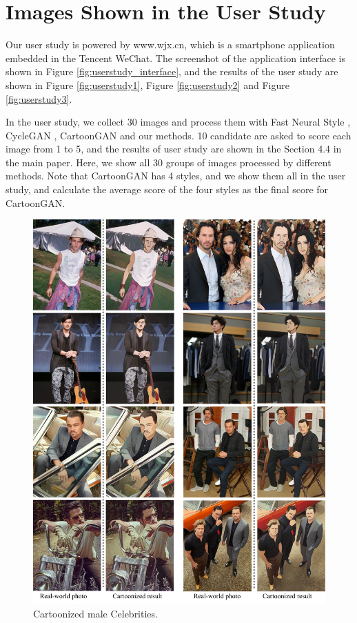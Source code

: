 \documentclass[10pt,twocolumn,letterpaper]{article}
\begin{document}
\section{Images Shown in the User Study}
Our user study is powered by www.wjx.cn, which is a smartphone application embedded in the Tencent WeChat. The screenshot of the application interface is shown in Figure \ref{fig:userstudy_interface}, and the results of the user study are shown in Figure \ref{fig:userstudy1},  Figure \ref{fig:userstudy2} and  Figure \ref{fig:userstudy3}.

In the user study, we collect 30 images and process them with Fast Neural Style \cite{johnson2016perceptual}, CycleGAN \cite{CycleGAN2017}, CartoonGAN \cite{chen2018cartoongan} and our methods. 10 candidate are asked to score each image from 1 to 5, and the results of user study are shown in the Section 4.4 in the main paper. Here, we show all 30 groups of images processed by different methods. Note that CartoonGAN has 4 styles, and we show them all in the user study, and calculate the average score of the four styles as the final score for CartoonGAN.

\newpage
{\small  }

\begin{figure}[b]
\vspace{-0.5em}
\centering
\includegraphics[width=\linewidth]{figures/person1.pdf}
\caption{Cartoonized male Celebrities.}
\label{fig:person1}
\vspace{-0.5em}
\end{figure}
\end{document}
